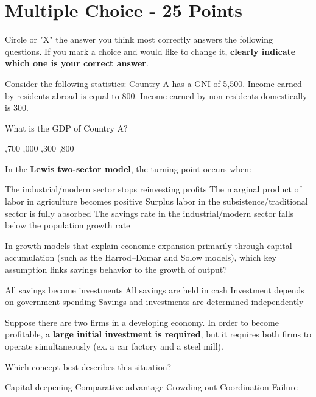 \documentclass[12pt]{exam}
\begin{document}
\section*{Multiple Choice - 25 Points}
Circle or "X" the answer you think most correctly answers the following questions. 
If you mark a choice and would like to change it, \textbf{clearly indicate which one is your correct answer}. 

\begin{questions}
\question
Consider the following statistics:
Country A has a GNI of 5,500. 
Income earned by residents abroad is equal to 800.
Income earned by non-residents domestically is 300.

What is the GDP of Country A?

\begin{choices}
    ,700
    ,000
    ,300
    ,800
\end{choices}

\question
In the \textbf{Lewis two-sector model}, the turning point occurs when:

\begin{choices}
    \choice The industrial/modern sector stops reinvesting profits
    \choice The marginal product of labor in agriculture becomes positive
    \CorrectChoice Surplus labor in the subsistence/traditional sector is fully absorbed
    \choice The savings rate in the industrial/modern sector falls below the population growth rate
\end{choices}

\question 
In growth models that explain economic expansion primarily through capital accumulation (such as the Harrod–Domar and Solow models), which key assumption links savings behavior to the growth of output?

\begin{choices}
    \CorrectChoice All savings become investments
    \choice All savings are held in cash
    \choice Investment depends on government spending
    \choice Savings and investments are determined independently
\end{choices}

\question 
Suppose there are two firms in a developing economy. 
In order to become profitable, a \textbf{large initial investment is required}, but it requires both firms to operate simultaneously (ex. a car factory and a steel mill).

Which concept best describes this situation?

\begin{choices}
    \choice Capital deepening
    \choice Comparative advantage
    \choice Crowding out
    \CorrectChoice Coordination Failure
\end{choices}


\end{questions}
\end{document}
